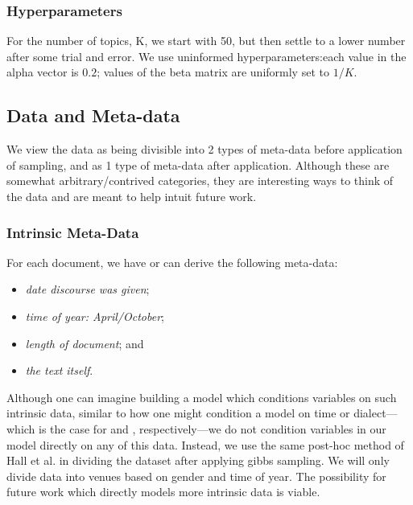 \subsubsection{Hyperparameters}
For the number of topics, K, we start with 50, but then settle to a lower number after some trial and error. We use uninformed hyperparameters:each value in the alpha vector is $0.2$; values of the beta matrix are uniformly set to $1/K$.

\subsection{Data and Meta-data}
We view the data as being divisible into 2 types of meta-data before application of sampling, and as 1 type of meta-data after application. Although these are somewhat arbitrary/contrived categories, they are interesting ways to think of the data and are meant to help intuit future work.

\subsubsection{Intrinsic Meta-Data}
For each document, we have or can derive the following meta-data:
	\begin{itemize}
		\item \textit{date discourse was given};
		\item \textit{time of year: April/October};
		\item \textit{length of document}; and
		\item \textit{the text itself}.
	\end{itemize}

Although one can imagine building a model which conditions variables on such intrinsic data, similar to how one might condition a model on time or dialect---which is the case for \cite{Wang:2006:TOT:1150402.1150450} and \cite{crain2010dialect}, respectively---we do not condition variables in our model directly on any of this data. Instead, we use the same post-hoc method of Hall et al. in dividing the dataset after applying gibbs sampling. We will only divide data into venues based on gender and time of year. The possibility for future work which directly models more intrinsic data is viable.

